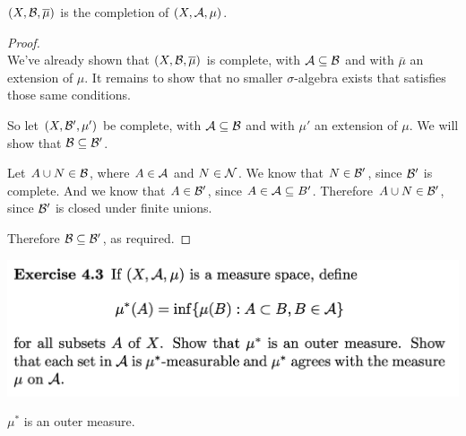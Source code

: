 \begin{claim*}
  $(X, \mathcal B, \overline{\mu})$ is the completion of $(X, \mathcal A, \mu)$.
\end{claim*}

\begin{proof}~\\
  We've already shown that $(X, \mathcal B, \overline\mu)$ is complete, with $\mathcal A \subseteq \mathcal B$ and with $\bar{\mu}$
  an extension of $\mu$. It remains to show that no smaller $\sigma$-algebra exists that satisfies those same
  conditions.

  So let $(X, \mathcal B', \mu')$ be complete, with $\mathcal A \subseteq \mathcal B$ and with $\mu'$ an extension of $\mu$.
  We will show that $\mathcal B \subseteq \mathcal B'$.

  Let $A \cup N \in \mathcal B$, where $A \in \mathcal A$ and $N \in \mathcal N$. We know that $N \in \mathcal B'$, since $\mathcal B'$
  is complete. And we know that $A \in \mathcal B'$, since $A \in \mathcal A \subseteq B'$.
  Therefore $A \cup N \in \mathcal B'$, since $\mathcal B'$ is closed under finite unions.

  Therefore $\mathcal B \subseteq \mathcal B'$, as required.
\end{proof}

\newpage
\begin{mdframed}
  \includegraphics[width=400pt]{img/analysis--berkeley-202a-hw-0d98.png}
\end{mdframed}

\begin{claim*}
  $\mu^*$ is an outer measure.
\end{claim*}

